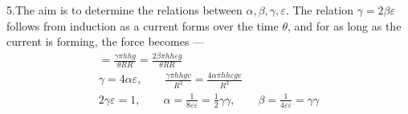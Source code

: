 5.\quad The aim is to determine the relations between $\alpha,\beta,\gamma,\varepsilon$. The relation $\gamma=2\beta\varepsilon$ follows from induction as a current forms over the time $\theta$, and for as long as the current is forming, the force becomes —
\[
\begin{gathered}
=\frac{\gamma\pi hhg}{\theta RR}=\frac{2\beta\pi hh\varepsilon g}{\theta RR}\\[6pt]
\gamma=4\alpha\varepsilon,\qquad\frac{\gamma\pi hhgv}{R^3}=\frac{4\alpha\pi hh\varepsilon gv}{R^3}\\[6pt]
2\gamma\varepsilon=1,\qquad\alpha=\frac{1}{8\varepsilon\varepsilon}=\tfrac{1}{2}\gamma\gamma,\qquad\beta=\frac{1}{4\varepsilon\varepsilon}=\gamma\gamma
\end{gathered}
\]

